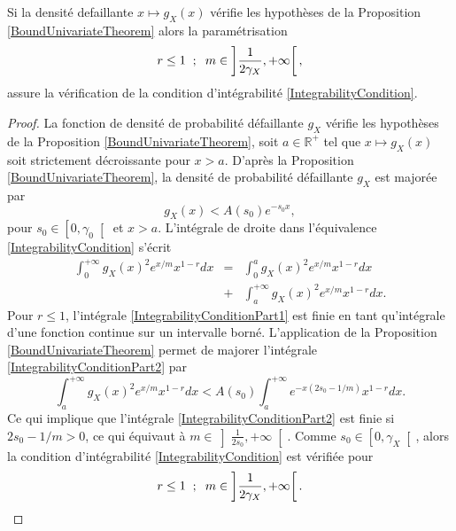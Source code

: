 \begin{Cor}\label{CorrolaryParameterChoiceUnivariate}
Si la densité defaillante $x\mapsto g_{X}(x)$ vérifie les hypothèses de la Proposition \ref{BoundUnivariateTheorem} alors la paramétrisation
\begin{equation}\label{ParametersSelection}
r\leq1\hspace{0.2cm};\hspace{0.2cm} m\in\left]\frac{1}{2\gamma_{X}},+\infty\right[,
\end{equation}
assure la vérification de la condition d\rq{}intégrabilité \eqref{IntegrabilityCondition}.
\end{Cor}
\begin{proof}
La fonction de densité de probabilité défaillante $g_{X}$ vérifie les hypothèses de la Proposition \ref{BoundUnivariateTheorem}, soit $a\in\mathbb{R}^{+}$ tel que $x\mapsto g_{X}(x)$ soit strictement décroissante pour $x>a$. D\rq{}après la Proposition \ref{BoundUnivariateTheorem}, la densité de probabilité défaillante $g_{X}$ est majorée par 
\begin{equation}\label{BoundDensityG}
g_{X}(x)<A(s_{0})e^{-s_{0}x},
\end{equation}
pour $s_{0}\in\left[0,\gamma_{0}\right[$ et $x>a$. L'intégrale de droite dans l'équivalence \eqref{IntegrabilityCondition} s\rq{}écrit
\begin{eqnarray}
\int_{0}^{+\infty}g_{X}(x)^{2}e^{x/m}x^{1-r}dx&=&\int_{0}^{a}g_{X}(x)^{2}e^{x/m}x^{1-r}dx\label{IntegrabilityConditionPart1}\\
&+&\int_{a}^{+\infty}g_{X}(x)^{2}e^{x/m}x^{1-r}dx\label{IntegrabilityConditionPart2}.
\end{eqnarray}
Pour $r\leq1$, l\rq{}intégrale \eqref{IntegrabilityConditionPart1} est finie en tant qu\rq{}intégrale d\rq{}une fonction continue sur un intervalle borné. L\rq{}application de la Proposition \ref{BoundUnivariateTheorem} permet de majorer l\rq{}intégrale \eqref{IntegrabilityConditionPart2} par
\begin{equation}
\int_{a}^{+\infty}g_{X}(x)^{2}e^{x/m}x^{1-r}dx<A(s_{0})\int_{a}^{+\infty}e^{-x(2s_{0}-1/m)}x^{1-r}dx.
\end{equation}
Ce qui implique que l\rq{}intégrale \eqref{IntegrabilityConditionPart2} est finie si $2s_{0}-1/m>0$, ce qui équivaut à $m\in\left]\frac{1}{2s_{0}},+\infty\right[$. Comme $s_{0}\in\left[0,\gamma_{X}\right[$, alors la condition d\rq{}intégrabilité \eqref{IntegrabilityCondition} est vérifiée pour 
\begin{equation*}
r\leq1\hspace{0.2cm};\hspace{0.2cm} m\in\left]\frac{1}{2\gamma_{X}},+\infty\right[.
\end{equation*}
\end{proof}
